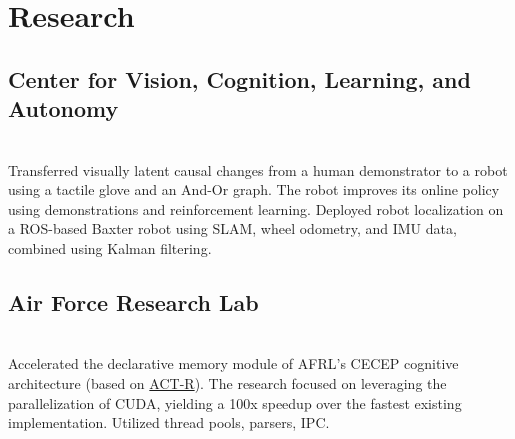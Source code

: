 \documentclass[letterpaper]{deedy-resume} %
\begin{document}
\hfill
%
%
\begin{minipage}[t]{0.66\textwidth} %


\section{Research}

\subsection{Center for Vision, Cognition, Learning, and Autonomy}
 \hfill {} \\ 
\smallsectionspace
Transferred visually latent causal changes from a human demonstrator to a robot using a tactile glove and an And-Or graph. The robot improves its online policy using demonstrations and reinforcement learning. Deployed robot localization on a ROS-based Baxter robot using SLAM, wheel odometry, and IMU data, combined using Kalman filtering.

\sectionspace %


\subsection{Air Force Research Lab}
 \hfill {} \\
\smallsectionspace %
Accelerated the declarative memory module of AFRL's CECEP cognitive architecture (based on \href{http://act-r.psy.cmu.edu/}{ACT-R}). The research focused on leveraging the parallelization of CUDA, yielding a 100x speedup over the fastest existing implementation. Utilized thread pools, parsers, IPC.

\sectionspace %



\end{minipage}
\end{document}
